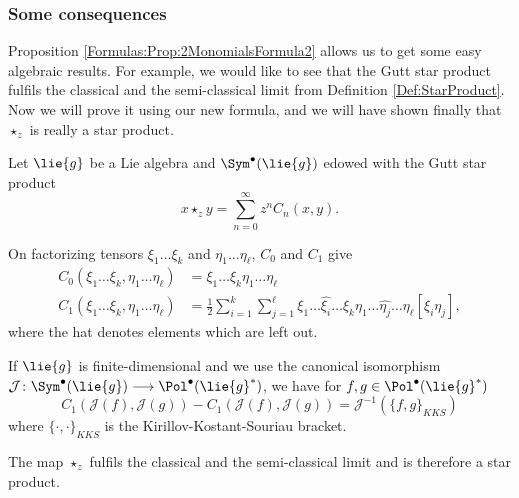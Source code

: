 \subsubsection*{Some consequences}
Proposition \ref{Formulas:Prop:2MonomialsFormula2} allows us to get some easy 
algebraic results. For example, we would like to see that the Gutt star 
product fulfils the classical and the semi-classical limit from Definition 
\ref{Def:StarProduct}. Now we will prove it using our new formula, and we will 
have shown finally that $\star_z$ is really a star product.
\begin{corollary}
	\label{Formulas:Cor:LimitCases}
	Let $\lie{g}$ be a Lie algebra and $\Sym^{\bullet}(\lie{g})$ edowed with 
	the Gutt star product
	\begin{equation*}
		x \star_z y
		= 
		\sum\limits_{n = 0}^{\infty}
		z^n C_n(x,y).
	\end{equation*}	
	\begin{corollarylist}
		\item
		On factorizing tensors $\xi_1 \ldots \xi_k$ and $\eta_1 \ldots 
		\eta_{\ell}$, $C_0$ and $C_1$ give
		\begin{align}
			\label{Formulas:ClassicalLimit}
			C_0 \left(
				\xi_1 \ldots \xi_k, \eta_1 \ldots \eta_{\ell}
			\right)
			& = 
			\xi_1 \ldots \xi_k \eta_1 \ldots \eta_{\ell}
			\\
			\label{Formulas:SemiClassicalLimit}
			C_1 \left(
				\xi_1 \ldots \xi_k, \eta_1 \ldots \eta_{\ell}
			\right)
				& =
			\frac{1}{2}	
			\sum\limits_{i = 1}^k
			\sum\limits_{j = 1}^{\ell}
			\xi_1 \ldots \widehat{\xi_i} \ldots \xi_k
			\eta_1 \ldots \widehat{\eta_j} \ldots \eta_{\ell}
			[\xi_i \eta_j],
		\end{align}
		where the hat denotes elements which are left out.
		
		\item
		If $\lie{g}$ is finite-dimensional and we use the canonical 
		isomorphism $\mathcal{J} \colon \Sym^{\bullet}(\lie{g}) 
		\longrightarrow \Pol^{\bullet}(\lie{g}^*)$, we have for
		$f,g \in \Pol^{\bullet}(\lie{g}^*)$
		\begin{equation*}
			C_1 \left(
				\mathcal{J} (f),
				\mathcal{J} (g)
			\right)
			-
			C_1 \left(
				\mathcal{J} (f),
				\mathcal{J} (g)
			\right)
			= 
			\mathcal{J}^{-1} \left( 
				\{ f, g \}_{KKS}
			\right)
		\end{equation*}
		where $\{ \cdot, \cdot \}_{KKS}$ is the Kirillov-Kostant-Souriau 
		bracket.
		
		\item
		The map $\star_z$ fulfils the classical and the semi-classical limit 
		and is therefore a star product.
	\end{corollarylist}
\end{corollary}
